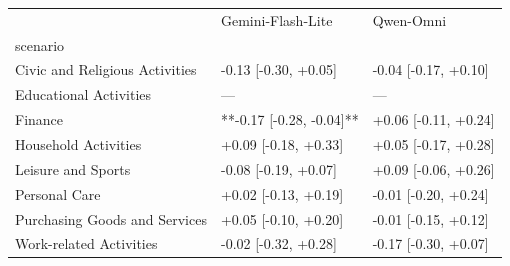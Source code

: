 \begin{tabular}{lll}
\toprule
 & Gemini-Flash-Lite & Qwen-Omni \\
scenario &  &  \\
\midrule
Civic and Religious Activities & -0.13 [-0.30, +0.05] & -0.04 [-0.17, +0.10] \\
Educational Activities & — & — \\
Finance & **-0.17 [-0.28, -0.04]** & +0.06 [-0.11, +0.24] \\
Household Activities & +0.09 [-0.18, +0.33] & +0.05 [-0.17, +0.28] \\
Leisure and Sports & -0.08 [-0.19, +0.07] & +0.09 [-0.06, +0.26] \\
Personal Care & +0.02 [-0.13, +0.19] & -0.01 [-0.20, +0.24] \\
Purchasing Goods and Services & +0.05 [-0.10, +0.20] & -0.01 [-0.15, +0.12] \\
Work-related Activities & -0.02 [-0.32, +0.28] & -0.17 [-0.30, +0.07] \\
\bottomrule
\end{tabular}
